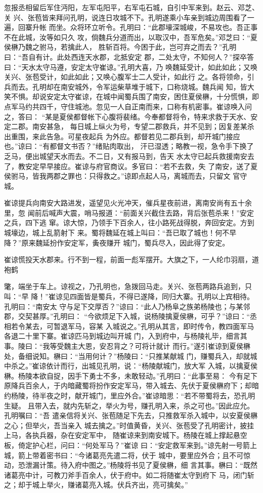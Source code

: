忽报丞相留后军住沔阳，左军屯阳平，右军屯石城，自引中军来到。赵云、邓芝、关
兴、张苞皆来拜问孔明，说连日攻城不下。孔明遂乘小车亲到城边周围看了一遍，回寨升帐
而坐。众将环立听令。孔明曰：“此郡壕深城峻，不易攻也。吾正事不在此城，汝等如只久
攻，倘魏兵分道而出，以取汉中，吾军危矣。”邓芝曰：“夏侯楙乃魏之驸马，若擒此人，
胜斩百将。今困于此，岂可弃之而去？”孔明曰：“吾自有计。此处西连天水郡，北抵安定
郡，二处太守，不知何人？”探卒答曰：“天水太守马遵，安定太守崔谅。”孔明大喜，乃
唤魏延受计，如此如此；又唤关兴、张苞受计，如此如此；又唤心腹军士二人受计，如此行
之。各将领命，引兵而去。孔明却在南安城外，令军运柴草堆于城下，口称烧城。魏兵闻
知，皆大笑不惧。却说安定太守崔谅，在城中闻蜀兵围了南安，困住夏侯楙，十分慌惧，即
点军马约共四千，守住城池。忽见一人自正南而来，口称有机密事。崔谅唤入问之，答曰：
“某是夏侯都督帐下心腹将裴绪。今奉都督将令，特来求救于天水、安定二郡。南安甚急，
每日城上纵火为号，专望二郡救兵，并不见到；因复差某杀出重围，来此告急。可星夜起兵
为外应。都督若见二郡兵到，却开城门接应也。”谅曰：“有都督文书否？”绪贴肉取出，
汗已湿透；略教一视，急令手下换了乏马，便出城望天水而去。不二日，又有报马到，告天
水太守已起兵救援南安去了，教安定早早接应。崔谅与府官商议。多官曰：“若不去救，失
了南安，送了夏侯驸马，皆我两郡之罪也：只得救之。”谅即点起人马，离城而去，只留文
官守城。

崔谅提兵向南安大路进发，遥望见火光冲天，催兵星夜前进，离南安尚有五十余里，忽
闻前后喊声大震，哨马报道：“前面关兴截住去路，背后张苞杀来！”安定之兵，四下逃
窜。谅大惊，乃领手下百余人，往小路死战得脱，奔回安定。方到城壕边，城上乱箭射下
来。蜀将魏延在城上叫曰：“吾已取了城也！何不早降？”原来魏延扮作安定军，夤夜赚开
城门，蜀兵尽入，因此得了安定。

崔谅慌投天水郡来。行不到一程，前面一彪军摆开。大旗之下，一人纶巾羽扇，道袍鹤

氅，端坐于车上。谅视之，乃孔明也，急拨回马走。关兴、张苞两路兵追到，只叫：“早
降！”崔谅见四面皆是蜀兵，不得已遂降，同归大寨。孔明以上宾相待。孔明曰：“南安太
守与足下交厚否？”谅曰：“此人乃杨阜之族弟杨陵也；与某邻郡，交契甚厚。”孔明曰：
“今欲烦足下入城，说杨陵擒夏侯楙，可乎？”谅曰：“丞相若令某去，可暂退军马，容某
入城说之。”孔明从其言，即时传令，教四面军马各退二十里下寨。崔谅匹马到城边叫开城
门，入到府中，与杨陵礼毕，细言其事。陵曰：“我等受魏主大恩，安忍背之？可将计就计
而行。”遂引崔谅到夏侯楙处，备细说知。楙曰：“当用何计？”杨陵曰：“只推某献城
门，赚蜀兵入，却就城中杀之。”崔谅依计而行，出城见孔明，说：“杨陵献城门，放大军
入城，以擒夏侯楙。杨陵本欲自捉，因手下勇士不多，未敢轻动。”孔明曰：“此事至易：
今有足下原降兵百余人，于内暗藏蜀将扮作安定军马，带入城去、先伏于夏侯楙府下；却暗
约杨陵，待半夜之时，献开城门，里应外合。”崔谅暗思：“若不带蜀将去，恐孔明生疑。
且带入去，就内先斩之，举火为号，赚孔明入来，杀之可也。”因此应允。孔明嘱曰：“吾
遣亲信将关兴、张苞随足下先去，只推救军杀入城中，以安夏侯楙之心；但举火，吾当亲入
城去擒之。”时值黄昏，关兴、张苞受了孔明密计，披挂上马，各执兵器，杂在安定军中，
随崔谅来到南安城下。杨陵在城上撑起悬空板，倚定护心栏，问曰：“何处军马？”崔谅
曰：“安定救军来到。”谅先射一号箭上城，箭上带着密书曰：“今诸葛亮先遣二将，伏于
城中，要里应外合；且不可惊动，恐泄漏计策。待入府中图之。”杨陵将书见了夏侯楙，细
言其事。楙曰：“既然诸葛亮中计，可教刀斧手百余人，伏于府中。如二将随崔太守到府下
马，闭门斩之；却于城上举火，赚诸葛亮入城。伏兵齐出，亮可擒矣。”


